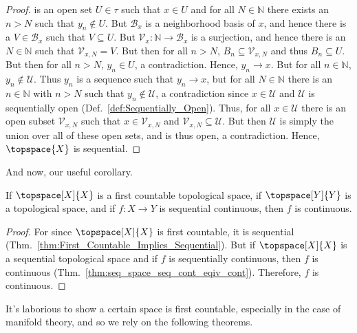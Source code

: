 \begin{proof}
            is an open set $U\in\tau$ such that $x\in{U}$ and for all
            $N\in\mathbb{N}$ there exists an $n>N$ such that $y_{n}\notin{U}$.
            But $\mathcal{B}_{x}$ is a neighborhood basis of $x$, and hence
            there is a $V\in\mathcal{B}_{x}$ such that $V\subseteq{U}$. But
            $\mathcal{V}_{x}:\mathbb{N}\rightarrow\mathcal{B}_{x}$ is a
            surjection, and hence there is an $N\in\mathbb{N}$ such that
            $\mathcal{V}_{x,N}=V$. But then for all $n>N$,
            $B_{n}\subseteq\mathcal{V}_{x,N}$ and thus $B_{n}\subseteq{U}$.
            But then for all $n>N$, $y_{n}\in{U}$, a contradiction. Hence,
            $y_{n}\rightarrow{x}$. But for all $n\in\mathbb{N}$,
            $y_{n}\notin\mathcal{U}$. Thus $y_{n}$ is a sequence such that
            $y_{n}\rightarrow{x}$, but for all $N\in\mathbb{N}$ there is an
            $n\in\mathbb{N}$ with $n>N$ such that $y_{n}\notin\mathcal{U}$, a
            contradiction since $x\in\mathcal{U}$ and $\mathcal{U}$ is
            sequentially open (Def.~\ref{def:Sequentially_Open}). Thus, for all
            $x\in\mathcal{U}$ there is an open subset $\mathcal{V}_{x,N}$ such
            that $x\in\mathcal{V}_{x,N}$ and
            $\mathcal{V}_{x,N}\subseteq\mathcal{U}$. But then $\mathcal{U}$ is
            simply the union over all of these open sets, and is thus open,
            a contradiction. Hence, $\topspace{X}$ is sequential.
        \end{proof}
        And now, our useful corollary.
        \begin{theorem}
            \label{thm:First_Countable_Implies_Seq_Cont_is_Cont}%
            If $\topspace[X]{X}$ is a first countable topological space, if
            $\topspace[Y]{Y}$ is a topological space, and if $f:X\rightarrow{Y}$
            is sequential continuous, then $f$ is continuous.
        \end{theorem}
        \begin{proof}
            For since $\topspace[X]{X}$ is first countable, it is sequential
            (Thm.~\ref{thm:First_Countable_Implies_Sequential}). But if
            $\topspace[X]{X}$ is a sequential topological space and if $f$ is
            sequentially continuous, then $f$ is continuous
            (Thm.~\ref{thm:seq_space_seq_cont_eqiv_cont}). Therefore, $f$ is
            continuous.
        \end{proof}
        It's laborious to show a certain space is first countable, especially in
        the case of manifold theory, and so we rely on the following theorems.

